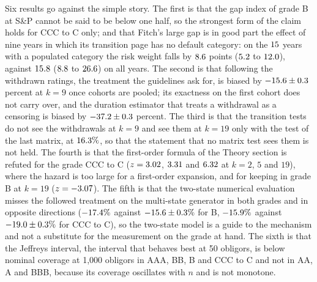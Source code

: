Six results go against the simple story. The first is that the gap index of grade B at S\&P cannot be said to be below one half, so the strongest form of the claim holds for CCC to C only; and that Fitch's large gap is in good part the effect of nine years in which its transition page has no default category: on the $15$ years with a populated category the risk weight falls by $8.6$ points ($5.2$ to $12.0$), against $15.8$ ($8.8$ to $26.6$) on all years. The second is that following the withdrawn ratings, the treatment the guidelines ask for, is biased by $-15.6\pm0.3$ percent at $k=9$ once cohorts are pooled; its exactness on the first cohort does not carry over, and the duration estimator that treats a withdrawal as a censoring is biased by $-37.2\pm0.3$ percent. The third is that the transition tests do not see the withdrawals at $k=9$ and see them at $k=19$ only with the test of the last matrix, at $16.3\%$, so that the statement that no matrix test sees them is not held. The fourth is that the first-order formula of the Theory section is refuted for the grade CCC to C ($z=3.02$, $3.31$ and $6.32$ at $k=2$, $5$ and $19$), where the hazard is too large for a first-order expansion, and for keeping in grade B at $k=19$ ($z=-3.07$). The fifth is that the two-state numerical evaluation misses the followed treatment on the multi-state generator in both grades and in opposite directions ($-17.4\%$ against $-15.6\pm0.3\%$ for B, $-15.9\%$ against $-19.0\pm0.3\%$ for CCC to C), so the two-state model is a guide to the mechanism and not a substitute for the measurement on the grade at hand. The sixth is that the Jeffreys interval, the interval that behaves best at 50 obligors, is below nominal coverage at 1{,}000 obligors in AAA, BB, B and CCC to C and not in AA, A and BBB, because its coverage oscillates with $n$ and is not monotone. %
